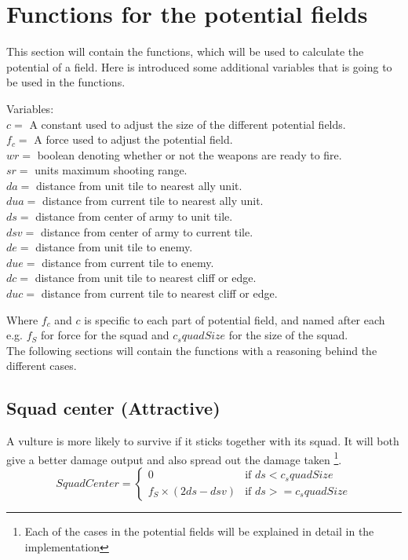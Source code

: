 \section{Functions for the potential fields}
	This section will contain the functions, which will be used to calculate the potential of a field. Here is introduced some additional variables that 
	is going to be used in the functions.
	
	\label{cha3_variables}
	Variables:\\
	$c =$ A constant used to adjust the size of the different potential fields.\\ 
	$f_c =$ A force used to adjust the potential field.\\
	$wr =$ boolean denoting whether or not the weapons are ready to fire.\\
	$sr =$ units maximum shooting range.\\
	$da =$ distance from unit tile to nearest ally unit.\\
	$dua =$ distance from current tile to nearest ally unit.\\
	$ds =$ distance from center of army to unit tile.\\
	$dsv =$ distance from center of army to current tile.\\
	$de =$ distance from unit tile to enemy.\\
	$due =$ distance from current tile to enemy.\\
	$dc =$ distance from unit tile to nearest cliff or edge. \\
	$duc =$ distance from current tile to nearest cliff or edge. 
	
	
	
	Where $f_c$ and $c$ is specific to each part of potential field, and named after each e.g. $f_{S}$ for force for the squad and $c_squadSize$ for the size of the squad.\\
	
	The following sections will contain the functions with a reasoning behind the different cases.
	
	\subsection*{Squad center (Attractive)}
		\label{SCA_label}A vulture is more likely to survive if it sticks together with its squad. 
		It will both give a better damage output and also spread out the damage taken
		\footnote{Each of the cases in the potential fields will be explained in detail in the implementation}.
		\begin{displaymath}
			SquadCenter  = \begin{cases}
					0 & \text{if } ds < c_squadSize \\
					f_{S} \times (2ds - dsv) & \text{if } ds >= c_squadSize
				\end{cases}		
		\end{displaymath}
		
